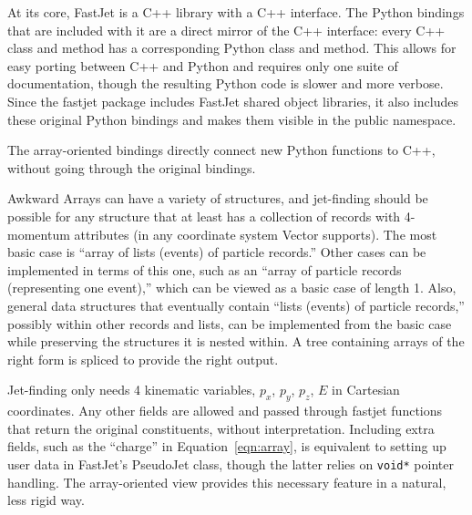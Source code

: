 \documentclass[a4paper]{jpconf}
\begin{document}

At its core, FastJet is a C++ library with a C++ interface. The Python bindings that are included with it are a direct mirror of the C++ interface: every C++ class and method has a corresponding Python class and method. This allows for easy porting between C++ and Python and requires only one suite of documentation, though the resulting Python code is slower and more verbose. Since the fastjet package includes FastJet shared object libraries, it also includes these original Python bindings and makes them visible in the public namespace.


The array-oriented bindings directly connect new Python functions to C++, without going through the original bindings.

Awkward Arrays can have a variety of structures, and jet-finding should be possible for any structure that at least has a collection of records with 4-momentum attributes (in any coordinate system Vector supports). The most basic case is ``array of lists (events) of particle records.'' Other cases can be implemented in terms of this one, such as an ``array of particle records (representing one event),'' which can be viewed as a basic case of length 1. Also, general data structures that eventually contain ``lists (events) of particle records,'' possibly within other records and lists, can be implemented from the basic case while preserving the structures it is nested within. A tree containing arrays of the right form is spliced to provide the right output.

Jet-finding only needs 4 kinematic variables, $p_x$, $p_y$, $p_z$, $E$ in Cartesian coordinates. Any other fields are allowed and passed through fastjet functions that return the original constituents, without interpretation. Including extra fields, such as the ``charge'' in Equation~\ref{eqn:array}, is equivalent to setting up user data in FastJet's PseudoJet class, though the latter relies on \texttt{void*} pointer handling. The array-oriented view provides this necessary feature in a natural, less rigid way.
\end{document}
